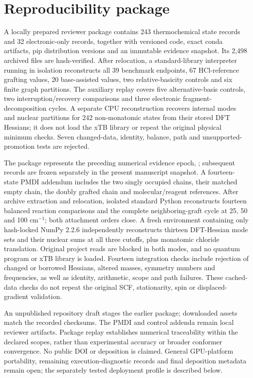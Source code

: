 \documentclass[11pt]{article}
\begin{document}
\section{Reproducibility package}
A locally prepared reviewer package contains 243 thermochemical state records and 32 electronic-only records, together with versioned code, exact conda artifacts, pip distribution versions and an immutable evidence snapshot. Its 2,498 archived files are hash-verified. After relocation, a standard-library interpreter running in isolation reconstructs all 39 benchmark endpoints, 67 HCl-reference grafting values, 20 base-assisted values, two relative-basicity controls and six finite graph partitions. The auxiliary replay covers five alternative-basis controls, two interruption/recovery comparisons and three electronic fragment-decomposition cycles. A separate CPU reconstruction recovers internal modes and nuclear partitions for 242 non-monatomic states from their stored DFT Hessians; it does not load the xTB library or repeat the original physical minimum checks. Seven changed-data, identity, balance, path and unsupported-promotion tests are rejected.

The package represents the preceding numerical evidence epoch, ; subsequent records are frozen separately in the present manuscript snapshot. A fourteen-state PMDI addendum includes the two singly occupied chains, their matched empty chain, the doubly grafted chain and molecular/reagent references. After archive extraction and relocation, isolated standard Python reconstructs fourteen balanced reaction comparisons and the complete neighboring-graft cycle at 25, 50 and 100 cm$^{-1}$; both attachment orders close. A fresh environment containing only hash-locked NumPy 2.2.6 independently reconstructs thirteen DFT-Hessian mode sets and their nuclear sums at all three cutoffs, plus monatomic chloride translation. Original project reads are blocked in both modes, and no quantum program or xTB library is loaded. Fourteen integration checks include rejection of changed or borrowed Hessians, altered masses, symmetry numbers and frequencies, as well as identity, arithmetic, scope and path failures. These cached-data checks do not repeat the original SCF, stationarity, spin or displaced-gradient validation.

An unpublished repository draft stages the earlier package; downloaded assets match the recorded checksums. The PMDI and control addenda remain local reviewer artifacts. Package replay establishes numerical traceability within the declared scopes, rather than experimental accuracy or broader conformer convergence. No public DOI or deposition is claimed. General GPU-platform portability, remaining execution-diagnostic records and final deposition metadata remain open; the separately tested deployment profile is described below.
\end{document}
